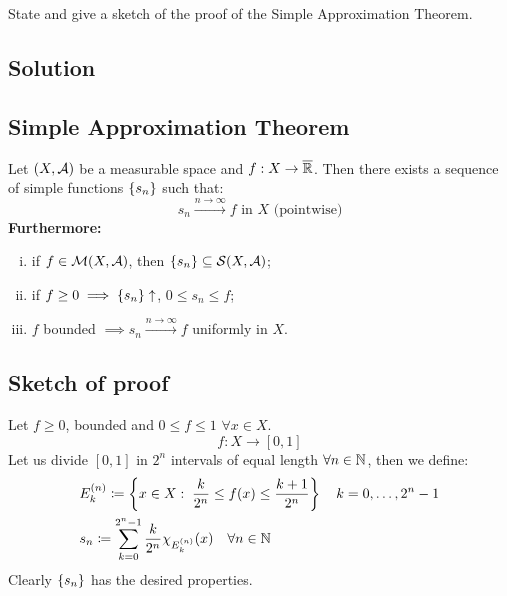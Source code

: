 

\question

State and give a sketch of the proof of the Simple Approximation Theorem.

\subsection*{Solution}

\subsection{Simple Approximation Theorem}\label{SAT}
Let $(X,\mathcal{A})$ be a measurable space and $f:X\to\overline{\mathbb{R}}$. Then there exists a sequence of simple functions $\{ s_n \}$ such that:
\[
    s_n \xrightarrow{n\to\infty} f \text{ in } X \text{ (pointwise)}
\]
\textbf{Furthermore:}
\begin{enumerate}[i)]
    \item if $f\in\mathcal{M}(X,\mathcal{A})$, then $\{ s_n \}\subseteq\mathcal{S}(X,\mathcal{A})$;
    \item if $f\geq 0 \implies \{ s_n \} \uparrow$, $0\leq s_n \leq f$;
    \item $f$ bounded $\implies s_n \xrightarrow{n\to\infty} f$ uniformly in $X$.
\end{enumerate}

\subsection*{Sketch of proof}
Let $f\geq0$, bounded and $0 \leq f \leq 1$ $\forall x\in X$.
\[
    f : X \to [0,1]
\]
Let us divide $[0,1]$ in $2^n$ intervals of equal length $\forall n \in \mathbb{N}$, then we define:
\begin{align*}
     & E_k^{(n)} \coloneqq \left\{ x\in X: \; \frac{k}{2^n} \leq f(x) \leq \frac{k+1}{2^n} \right\} \quad k = 0,\dots,2^n-1 \\
     & s_n \coloneqq \sum_{k=0}^{2^n-1} \frac{k}{2^n} \chi_{E_k^{(n)}}(x) \quad \forall n\in\mathbb{N}
\end{align*}
Clearly $\{ s_n \}$ has the desired properties.